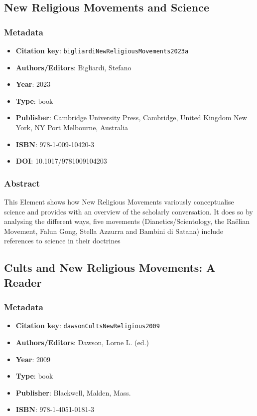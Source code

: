 \subsection{New Religious Movements and Science}\label{lit:bigliardiNewReligiousMovements2023a}
\subsubsection*{Metadata}
\begin{itemize}
  \item \textbf{Citation key}: \texttt{bigliardiNewReligiousMovements2023a}
  \item \textbf{Authors/Editors}: Bigliardi, Stefano
  \item \textbf{Year}: 2023
  \item \textbf{Type}: book
  \item \textbf{Publisher}: Cambridge University Press, Cambridge, United Kingdom New York, NY Port Melbourne, Australia
  \item \textbf{ISBN}: 978-1-009-10420-3
  \item \textbf{DOI}: 10.1017/9781009104203
\end{itemize}
\subsubsection*{Abstract}
This Element shows how New Religious Movements variously conceptualise science and provides with an overview of the scholarly conversation. It does so by analysing the different ways, five movements (Dianetics/Scientology, the Raëlian Movement, Falun Gong, Stella Azzurra and Bambini di Satana) include references to science in their doctrines

\subsection{Cults and New Religious Movements: A Reader}\label{lit:dawsonCultsNewReligious2009}
\subsubsection*{Metadata}
\begin{itemize}
  \item \textbf{Citation key}: \texttt{dawsonCultsNewReligious2009}
  \item \textbf{Authors/Editors}: Dawson, Lorne L. (ed.)
  \item \textbf{Year}: 2009
  \item \textbf{Type}: book
  \item \textbf{Publisher}: Blackwell, Malden, Mass.
  \item \textbf{ISBN}: 978-1-4051-0181-3
\end{itemize}

